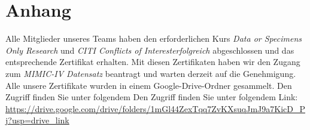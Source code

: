 \documentclass[12pt]{article}
\begin{document}
\newpage
\appendix

\section{Anhang}

Alle Mitglieder unseres Teams haben den erforderlichen Kurs \textit{Data or Specimens Only Research} und \textit{CITI Conflicts of Interesterfolgreich} abgeschlossen und das entsprechende Zertifikat erhalten. 
Mit diesen Zertifikaten haben wir den Zugang zum \textit{MIMIC-IV Datensatz} beantragt und warten derzeit auf die Genehmigung.
Alle unsere Zertifikate wurden in einem Google-Drive-Ordner gesammelt.
Den Zugriff finden Sie unter folgendem Den Zugriff finden Sie unter folgendem Link: \url{https://drive.google.com/drive/folders/1mGl44ZexTqq7ZvKXsuqJmJ9a7KicD_Pj?usp=drive_link}


\newpage
\end{document}
